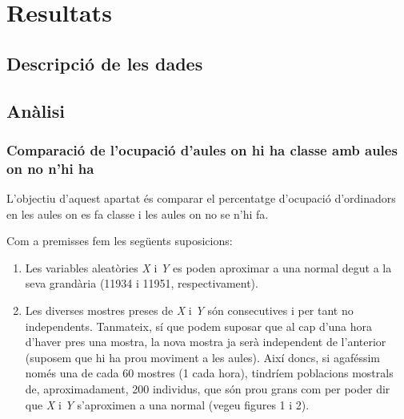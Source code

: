 \section{Resultats}
\captionsetup[figure]{labelsep=space}
\subsection{Descripció de les dades}


\subsection{Anàlisi}
\subsubsection{Comparació de l'ocupació d'aules on hi ha classe amb aules on no n'hi ha}
L'objectiu d'aquest apartat és comparar el percentatge d'ocupació d'ordinadors en les aules on es fa classe i les aules on no se n'hi fa.

Com a premisses fem les següents suposicions:
\begin{enumerate}
	\item Les variables aleatòries \emph{X} i \emph{Y} es poden aproximar a una normal degut a la seva grandària (11934 i 11951, respectivament).
	\item Les diverses mostres preses de \emph{X} i \emph{Y} són consecutives i per tant no independents. Tanmateix, sí que podem suposar que al cap d'una hora d'haver pres una mostra, la nova mostra ja serà independent de l'anterior (suposem que hi ha prou moviment a les aules). Així doncs, si agaféssim només una de cada 60 mostres (1 cada hora), tindríem poblacions mostrals de, aproximadament, 200 individus, que són prou grans com per poder dir que \emph{X} i \emph{Y} s'aproximen a una normal (vegeu figures 1 i 2).
\end{enumerate}

